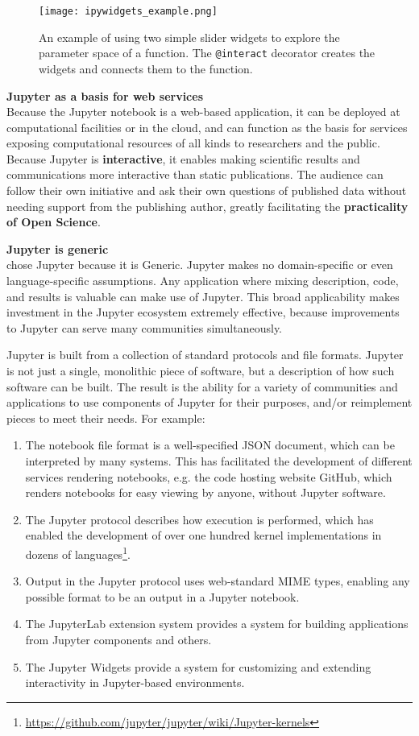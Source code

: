 \begin{figure}[ht]\centering
  \texttt{[image: ipywidgets\_example.png]}
  \caption{An example of using two simple slider widgets to explore the
  parameter space of a function. The \texttt{@interact} decorator creates
  the widgets and connects them to the function.}
  \label{fig:ipywidgets-example}
\end{figure}

\medskip
\noindent\textbf{Jupyter as a basis for web services}\\
Because the Jupyter notebook is a web-based application, it can be
deployed at computational facilities or in the cloud, and can function
as the basis for services exposing computational resources of all
kinds to researchers and the public.  Because Jupyter is
\textbf{interactive}, it enables making scientific results and
communications more interactive than static publications.  The
audience can follow their own initiative and ask their own questions
of published data without needing support from the publishing author,
greatly facilitating the \textbf{practicality of Open Science}.

\medskip
\noindent\textbf{Jupyter is generic}\\
\TheProject chose Jupyter because it is
Generic.  Jupyter makes no domain-specific or even language-specific
assumptions.  Any application where mixing description, code, and
results is valuable can make use of Jupyter.  This broad applicability
makes investment in the Jupyter ecosystem extremely effective, because
improvements to Jupyter can serve many communities simultaneously.

Jupyter is built from a collection of standard protocols and file
formats.  Jupyter is not just a single, monolithic piece of
software, but a description of how such software can be built.  The
result is the ability for a variety of communities and applications to
use components of Jupyter for their purposes, and/or reimplement pieces to
meet their needs.
%
For example:
\begin{enumerate}
\item The notebook file format is a well-specified JSON document,
  which can be interpreted by many systems.  This has facilitated the
  development of different services rendering notebooks, e.g. the code
  hosting website GitHub, which renders notebooks for easy viewing by
  anyone, without Jupyter software.
\item The Jupyter protocol describes how execution is performed, which
  has enabled the development of over one hundred kernel
  implementations in dozens of languages\footnote{\url{https://github.com/jupyter/jupyter/wiki/Jupyter-kernels}}.
\item Output in the Jupyter protocol uses web-standard MIME types,
  enabling any possible format to be an output in a Jupyter notebook.
\item The JupyterLab extension system provides a system for building
  applications from Jupyter components and others.
\item The Jupyter Widgets provide a system for customizing and
  extending interactivity in Jupyter-based environments.
\end{enumerate}

